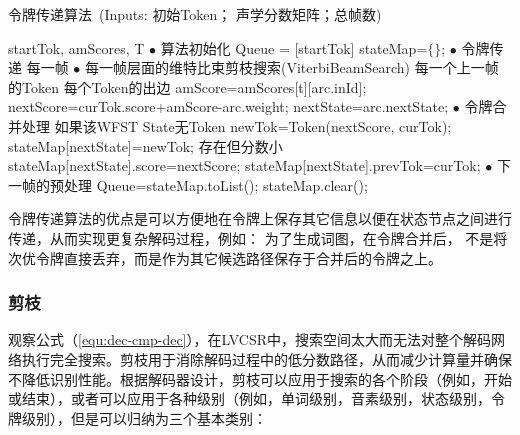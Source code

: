 \begin{algorithm}[ht]
\caption{令牌传递算法\ {(Inputs:  \textcolor[rgb]{0,0.5,0}{初始Token； 声学分数矩阵；总帧数})}}
\label{code:tokpass}
\begin{algorithmic}[1]
 {startTok, amScores, T}
\State    $\bullet$ \textrm{算法初始化}
\State Queue = [startTok]
\State stateMap=$\{\}$;
\State    $\bullet$ \textrm{令牌传递}
 \Comment \textcolor[rgb]{0,0.5,0}{每一帧}
\State    $\bullet$ \textrm{每一帧层面的维特比束剪枝搜索(ViterbiBeamSearch)}
 \Comment \textcolor[rgb]{0,0.5,0}{每一个上一帧的Token}
  \Comment \textcolor[rgb]{0,0.5,0}{每个Token的出边}
\State amScore=amScores[t][arc.inId];
\State nextScore=curTok.score+amScore-arc.weight;
\State nextState=arc.nextState;
\State    $\bullet$ \textrm{令牌合并处理}
  \Comment \textcolor[rgb]{0,0.5,0}{如果该WFST State无Token}
\State newTok=Token(nextScore, curTok);
\State stateMap[nextState]=newTok;
\EndIf
{}   \Comment \textcolor[rgb]{0,0.5,0}{存在但分数小}
\State stateMap[nextState].score=nextScore;
\State stateMap[nextState].prevTok=curTok;
\EndIf
\EndFor
\EndFor
\State $\bullet$ \textrm{下一帧的预处理}
\State Queue=stateMap.toList();
\State stateMap.clear();
\EndFor
\EndProcedure
\end{algorithmic}
\end{algorithm}

令牌传递算法的优点是可以方便地在令牌上保存其它信息以便在状态节点之间进行传递，从而实现更复杂解码过程，例如： 为了生成词图，在令牌合并后， 不是将次优令牌直接丢弃，而是作为其它候选路径保存于合并后的令牌之上。

\subsubsection{剪枝}

观察公式（\ref{equ:dec-cmp-dec}），在LVCSR中，搜索空间太大而无法对整个解码网络执行完全搜索。剪枝用于消除解码过程中的低分数路径，从而减少计算量并确保不降低识别性能。根据解码器设计，剪枝可以应用于搜索的各个阶段（例如，开始或结束），或者可以应用于各种级别（例如，单词级别，音素级别，状态级别，令牌级别），但是可以归纳为三个基本类别：

